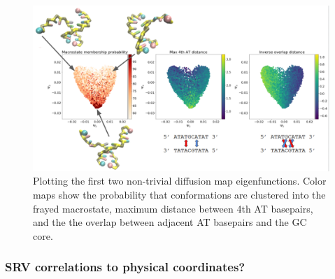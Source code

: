 \documentclass[journal=jpcbfk,manuscript=article]{achemso}
\begin{document}
\begin{figure}[ht!]
	\begin{center}
        \includegraphics[width=\textwidth]{Figs/figs_0804/GC-core_dmaps.png}
        \caption{Plotting the first two non-trivial diffusion map eigenfunctions. Color maps show the probability that conformations are clustered into the frayed macrostate, maximum distance between 4th AT basepairs, and the the overlap between adjacent AT basepairs and the GC core.}
        \label{fig:GC-core_dmaps}
	\end{center}
\end{figure}

\subsubsection{\label{sec:Results}SRV correlations to physical coordinates?}
\end{document}
